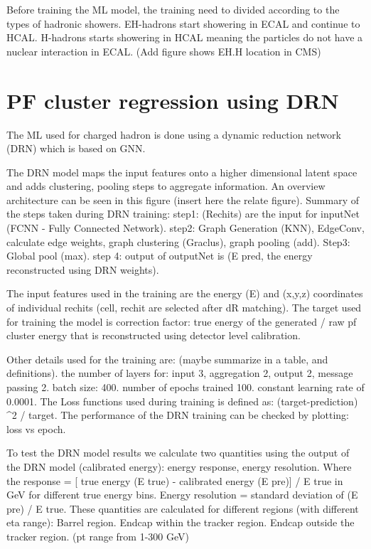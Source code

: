 Before training the ML model, the training need to divided according to the types of hadronic showers. EH-hadrons start showering in ECAL and continue to HCAL. H-hadrons starts showering in HCAL meaning the particles do not have a nuclear interaction in ECAL. (Add figure shows EH.H location in CMS)

\section{PF cluster regression using DRN}
The ML used for charged hadron is done using a dynamic reduction network (DRN) which is based on GNN. %

The DRN model maps the input features onto a higher dimensional latent space and adds clustering, pooling steps to aggregate information. An overview architecture can be seen in this figure (insert here the relate figure). Summary of the steps taken during DRN training: 
step1: (Rechits) are the input for inputNet (FCNN - Fully Connected Network). 
step2: Graph Generation (KNN), EdgeConv, calculate edge weights, graph clustering (Graclus), graph pooling (add). 
Step3: Global pool (max).  
step 4: output of outputNet is (E pred, the energy reconstructed using DRN weights).

The input features used in the training are the energy (E) and (x,y,z) coordinates of individual rechits (cell, rechit are selected after dR matching). The target used for training the model is correction factor:  true energy of the generated / raw pf cluster energy that is reconstructed using detector level calibration.

Other details used for the training are:  (maybe summarize in a table, and definitions).  
the number of layers for: input 3, aggregation 2, output 2, message passing 2.  
batch size: 400. 
number of epochs trained 100. 
constant learning rate of 0.0001.  
The Loss functions used during training is defined as: (target-prediction) ^2 / target.  
The performance of the DRN training can be checked by plotting: loss vs epoch.

To test the DRN model results we calculate two quantities using the output of the DRN model (calibrated energy): energy response, energy resolution.  
Where the response = [ true energy (E true) - calibrated energy (E pre)] / E true in GeV for different true energy bins. Energy resolution = standard deviation of (E pre) / E true.  
These quantities are calculated for different regions (with different eta range): Barrel region. Endcap within the tracker region. Endcap outside the tracker region. (pt range from 1-300 GeV)

